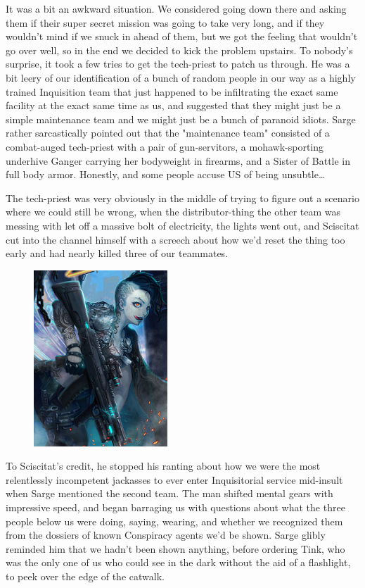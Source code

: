 It was a bit an awkward situation. 
We considered going down there and asking them if their super secret mission was going to take very long, and if they wouldn't mind if we snuck in ahead of them, but we got the feeling that wouldn't go over well, so in the end we decided to kick the problem upstairs. 
To nobody's surprise, it took a few tries to get the tech-priest to patch us through. 
He was a bit leery of our identification of a bunch of random people in our way as a highly trained Inquisition team that just happened to be infiltrating the exact same facility at the exact same time as us, and suggested that they might just be a simple maintenance team and we might just be a bunch of paranoid idiots. 
Sarge rather sarcastically pointed out that the "maintenance team" consisted of a combat-auged tech-priest with a pair of gun-servitors, a mohawk-sporting underhive Ganger carrying her bodyweight in firearms, and a Sister of Battle in full body armor. 
Honestly, and some people accuse US of being unsubtle…

The tech-priest was very obviously in the middle of trying to figure out a scenario where we could still be wrong, when the distributor-thing the other team was messing with let off a massive bolt of electricity, the lights went out, and Sciscitat cut into the channel himself with a screech about how we'd reset the thing too early and had nearly killed three of our teammates.

\begin{figure}
	\begin{center}
		\includegraphics[width=\figwidth]{pics/18/12.png}
	\end{center}
\end{figure}
To Sciscitat's credit, he stopped his ranting about how we were the most relentlessly incompetent jackasses to ever enter Inquisitorial service mid-insult when Sarge mentioned the second team. 
The man shifted mental gears with impressive speed, and began barraging us with questions about what the three people below us were doing, saying, wearing, and whether we recognized them from the dossiers of known Conspiracy agents we'd be shown. 
Sarge glibly reminded him that we hadn't been shown anything, before ordering Tink, who was the only one of us who could see in the dark without the aid of a flashlight, to peek over the edge of the catwalk. 


